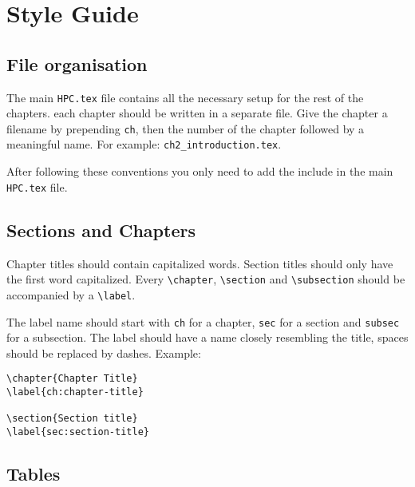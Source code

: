 \documentclass[11pt,a4paper,oneside]{book}
\begin{document}
\chapter{Style Guide}
\label{ch:style-guide}

\section{File organisation}
\label{sec:file-organisation}

The main \texttt{HPC.tex} file contains all the necessary setup for the rest of
the chapters. each chapter should be written in a separate file. Give the
chapter a filename by prepending \texttt{ch}, then the number of the chapter
followed by a meaningful name. For example: \texttt{ch2\_introduction.tex}.

After following these conventions you only need to add the include in the main
\texttt{HPC.tex} file.

\section{Sections and Chapters}
\label{sec:sections-and-chapters}

Chapter titles should contain capitalized words. Section titles should only
have the first word capitalized.  Every \texttt{\textbackslash{}chapter},
\texttt{\textbackslash{}section} and \texttt{\textbackslash{}subsection} should
be accompanied by a \texttt{\textbackslash{}label}.

The label name should start with \texttt{ch} for a chapter, \texttt{sec} for a
section and \texttt{subsec} for a subsection. The label should have a name
closely resembling the title, spaces should be replaced by dashes. Example:

\begin{verbatim}
\chapter{Chapter Title}
\label{ch:chapter-title}

\section{Section title}
\label{sec:section-title}
\end{verbatim}

\section{Tables}
\label{sec:tables}
\end{document}
